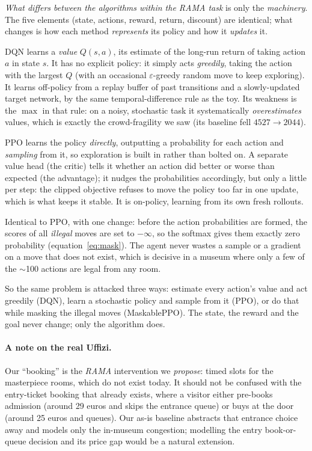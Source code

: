 \documentclass[11pt]{article}
\newcommand{\key}[1]{\textit{#1}}            %
\begin{document}
\emph{What differs between the algorithms within the RAMA task} is only the \emph{machinery}. The five
elements (state, actions, reward, return, discount) are identical; what changes is how each method
\emph{represents} its policy and how it \emph{updates} it.
\begin{description}[leftmargin=0pt,style=nextline,itemsep=3pt]
\item[DQN, value-based.] DQN learns a \emph{value} $Q(s,a)$, its estimate of the long-run return of
taking action $a$ in state $s$. It has no explicit policy: it simply acts \emph{greedily}, taking the
action with the largest $Q$ (with an occasional $\varepsilon$-greedy random move to keep exploring). It
learns off-policy from a replay buffer of past transitions and a slowly-updated target network, by the
same temporal-difference rule as the toy. Its weakness is the $\max$ in that rule: on a noisy,
stochastic task it systematically \emph{overestimates} values, which is exactly the crowd-fragility we
saw (its baseline fell $4527\to2044$).
\item[PPO, policy-gradient.] PPO learns the policy \emph{directly}, outputting a probability for each
action and \emph{sampling} from it, so exploration is built in rather than bolted on. A separate value
head (the critic) tells it whether an action did better or worse than expected (the advantage); it
nudges the probabilities accordingly, but only a little per step: the clipped objective refuses to move
the policy too far in one update, which is what keeps it stable. It is on-policy, learning from its own
fresh rollouts.
\item[MaskablePPO, PPO that knows the rulebook.] Identical to PPO, with one change: before the action
probabilities are formed, the scores of all \emph{illegal} moves are set to $-\infty$, so the softmax
gives them exactly zero probability (equation~\eqref{eq:mask}). The agent never wastes a sample or a
gradient on a move that does not exist, which is decisive in a museum where only a few of the
$\sim$100 actions are legal from any room.
\end{description}
So the same problem is attacked three ways: estimate every action's value and act greedily (DQN), learn
a stochastic policy and sample from it (PPO), or do that while masking the illegal moves (MaskablePPO).
The state, the reward and the goal never change; only the algorithm does.

\paragraph{A note on the real Uffizi.} Our ``booking'' is the \key{RAMA} intervention we
\emph{propose}: timed slots for the masterpiece rooms, which do not exist today. It should not
be confused with the entry-ticket booking that already exists, where a visitor either pre-books
admission (around 29 euros and skips the entrance queue) or buys at the door (around 25 euros
and queues). Our as-is baseline abstracts that entrance choice away and models only the
in-museum congestion; modelling the entry book-or-queue decision and its price gap would be a
natural extension.
\end{document}
